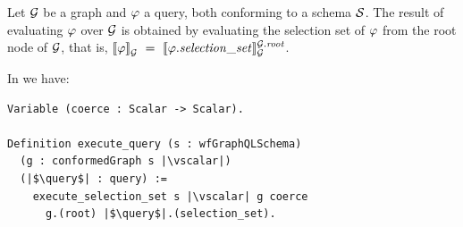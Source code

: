 
\begin{definition}
Let $\mathcal{G}$ be a graph and $\varphi$ a query, both conforming to a schema $\mathcal{S}$. The result of
evaluating $\varphi$ over $\mathcal{G}$ is obtained by evaluating the
selection set of $\varphi$ from the root node of $\mathcal{G}$, that is, $\llbracket \varphi \rrbracket^{}_{\mathcal{G}}
~=~\llbracket \varphi.\mathit{selection\_set} \rrbracket^{\mathcal{G}.\mathit{root}}_{\mathcal{G}}$.
\end{definition}

In \gcoql we have:
\begin{verbatim}
Variable (coerce : Scalar -> Scalar).

Definition execute_query (s : wfGraphQLSchema)
  (g : conformedGraph s |\vscalar|)
  (|$\query$| : query) :=
    execute_selection_set s |\vscalar| g coerce
      g.(root) |$\query$|.(selection_set).
\end{verbatim}






